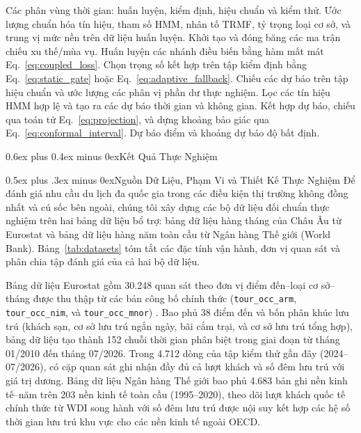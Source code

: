 \documentclass[10pt,journal,compsoc]{IEEEtran}
\makeatletter
\def\section{\@startsection{section}{1}{\z@}{-2.2ex plus -0.8ex minus -0.4ex}%
{0.6ex plus 0.4ex minus 0ex}{\normalfont\sublargesize\rmfamily\bfseries}}
\def\subsection{\@startsection{subsection}{2}{\z@}{-1.8ex plus -0.6ex minus -0.3ex}%
{0.5ex plus .3ex minus 0ex}{\normalfont\normalsize\rmfamily\bfseries}}
\makeatother
\begin{document}
\begin{algorithm}[!t]
\caption{Quy trình huấn luyện và suy diễn của RA-HE-DLinear}
\label{alg:pipeline}
\footnotesize
\begin{algorithmic}[1]
\REQUIRE Các phân vùng thời gian: huấn luyện, kiểm định, hiệu chuẩn và kiểm thử.
\STATE Ước lượng chuẩn hóa tín hiệu, tham số HMM, nhân tố TRMF, tỷ trọng loại cơ sở, và trung vị mức nền trên dữ liệu huấn luyện.
\STATE Khởi tạo và đóng băng các ma trận chiếu xu thế/mùa vụ. Huấn luyện các nhánh điều biến bằng hàm mất mát Eq.~\eqref{eq:coupled_loss}.
\STATE Chọn trọng số kết hợp trên tập kiểm định bằng Eq.~\eqref{eq:static_gate} hoặc Eq.~\eqref{eq:adaptive_fallback}.
\STATE Chiếu các dự báo trên tập hiệu chuẩn và ước lượng các phân vị phần dư thực nghiệm.
    \STATE Lọc các tín hiệu HMM hợp lệ và tạo ra các dự báo thời gian và không gian.
    \STATE Kết hợp dự báo, chiếu qua toán tử Eq.~\eqref{eq:projection}, và dựng khoảng bảo giác qua Eq.~\eqref{eq:conformal_interval}.
\ENDFOR
\RETURN Dự báo điểm và khoảng dự báo độ bất định.
\end{algorithmic}
\end{algorithm}

\section{\texorpdfstring{Kết Quả Thực Nghiệm}{Ket Qua Thuc Nghiem}}
\label{sec:results}

\subsection{Nguồn Dữ Liệu, Phạm Vi và Thiết Kế Thực Nghiệm}
\label{sec:data_design}
Để đánh giá nhu cầu du lịch đa quốc gia trong các điều kiện thị trường không đồng nhất và cú sốc bên ngoài, chúng tôi xây dựng các bộ dữ liệu đối chuẩn thực nghiệm trên hai bảng dữ liệu bổ trợ: bảng dữ liệu hàng tháng của Châu Âu từ Eurostat và bảng dữ liệu hàng năm toàn cầu từ Ngân hàng Thế giới (World Bank). Bảng~\ref{tab:datasets} tóm tắt các đặc tính vận hành, đơn vị quan sát và phân chia tập đánh giá của cả hai bộ dữ liệu.

Bảng dữ liệu Eurostat gồm 30.248 quan sát theo đơn vị điểm đến--loại cơ sở--tháng được thu thập từ các bản công bố chính thức (\texttt{tour\_\allowbreak occ\_\allowbreak arm}, \texttt{tour\_\allowbreak occ\_\allowbreak nim}, và \texttt{tour\_\allowbreak occ\_\allowbreak mnor}) \cite{eurostat_tourism_release,eurostat_api_metadata}. Bao phủ 38 điểm đến và bốn phân khúc lưu trú (khách sạn, cơ sở lưu trú ngắn ngày, bãi cắm trại, và cơ sở lưu trú tổng hợp), bảng dữ liệu tạo thành 152 chuỗi thời gian phân biệt trong giai đoạn từ tháng 01/2010 đến tháng 07/2026. Trong 4.712 dòng của tập kiểm thử gần đây (2024--07/2026), có \ReviewerObservedPairs{} cặp quan sát ghi nhận đầy đủ cả lượt khách và số đêm lưu trú với giá trị dương. Bảng dữ liệu Ngân hàng Thế giới bao phủ 4.683 bản ghi nền kinh tế--năm trên 203 nền kinh tế toàn cầu (1995--2020), theo dõi lượt khách quốc tế chính thức từ WDI song hành với số đêm lưu trú được nội suy kết hợp các hệ số thời gian lưu trú khu vực cho các nền kinh tế ngoài OECD.
\end{document}

